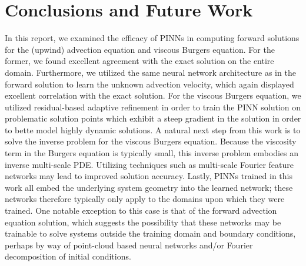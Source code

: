 \documentclass[letterpaper,11pt]{article}
\begin{document}
    \section{Conclusions and Future Work}\label{sec:goals}
    In this report, we examined the efficacy of PINNs in computing forward solutions for the (upwind) advection equation
    and viscous Burgers equation. For the former, we found excellent agreement with the exact solution on the entire
    domain. Furthermore, we utilized the same neural network architecture as in the forward solution to learn the 
    unknown advection velocity, which again displayed excellent correlation with the exact solution.
    For the viscous Burgers equation, we utilized residual-based adaptive refinement in order to train the PINN solution
    on problematic solution points which exhibit a steep gradient in the solution in order to bette model highly 
    dynamic solutions. A natural next step from this work is to solve the inverse problem for the viscous Burgers 
    equation. Because the viscosity term in the Burgers equation is typically small, this inverse problem embodies an
    inverse multi-scale PDE. Utilizing techniques such as multi-scale Fourier feature networks may lead to improved 
    solution accuracy.\cite{Wang_2021} Lastly, PINNs trained in this work all embed the underlying system geometry into
    the learned network; these networks therefore typically only apply to the domains upon which they were trained. One 
    notable exception to this case is that of the forward advection equation solution, which suggests the possibility 
    that these networks may be trainable to solve systems outside the training domain and boundary conditions, perhaps 
    by way of point-cloud based neural networks and/or Fourier decomposition of initial conditions.\cite{Kashefi_2022}
    

    \pagebreak

    
    
\end{document}
